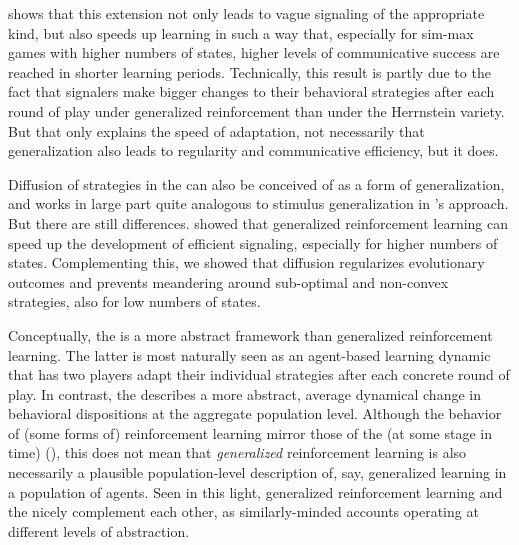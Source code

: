 \documentclass[fleqn,reqno,10pt]{article}
\newcommand{\rd}{\acro{rd}} %
\newcommand{\rdd}{\acro{rdd}} %
\begin{document}
\citet{OConnor2013:The-Evolution-o} shows that this extension not only
leads to vague signaling of the appropriate kind, but also speeds up
learning in such a way that, especially for sim-max games with higher
numbers of states, higher levels of communicative success are reached
in shorter learning periods. Technically, this result is partly due to
the fact that signalers make bigger changes to their behavioral
strategies after each round of play under generalized reinforcement
than under the Herrnstein variety. But that only explains the speed of
adaptation, not necessarily that generalization also leads to
regularity and communicative efficiency, but it does.

Diffusion of strategies in the \rdd can also be conceived of as a form
of generalization, and works in large part quite analogous to stimulus
generalization in \citeauthor{OConnor2013:The-Evolution-o}'s
approach. But there are still
differences. \citeauthor{OConnor2013:The-Evolution-o} showed that
generalized reinforcement learning can speed up the development of
efficient signaling, especially for higher numbers of
states. Complementing this, we showed that diffusion regularizes
evolutionary outcomes and prevents meandering around sub-optimal and
non-convex strategies, also for low numbers of states.

Conceptually, the \rdd is a more abstract framework than generalized
reinforcement learning. The latter is most naturally seen as an
agent-based learning dynamic that has two players adapt their
individual strategies after each concrete round of play. In contrast,
the \rdd describes a more abstract, average dynamical change in
behavioral dispositions at the aggregate population level. Although
the behavior of (some forms of) reinforcement learning mirror those of
the \rd (at some stage in time)
(\cite{BorgersSarin997:Learning-Throug,HopkinsPosch2005:Attainability-o,Beggs2005:On-the-Converge}),
this does not mean that \emph{generalized} reinforcement learning is
also necessarily a plausible population-level description of, say,
generalized learning in a population of agents. Seen in this light,
generalized reinforcement learning and the \rdd nicely complement each
other, as similarly-minded accounts operating at different levels of
abstraction.
\end{document}
